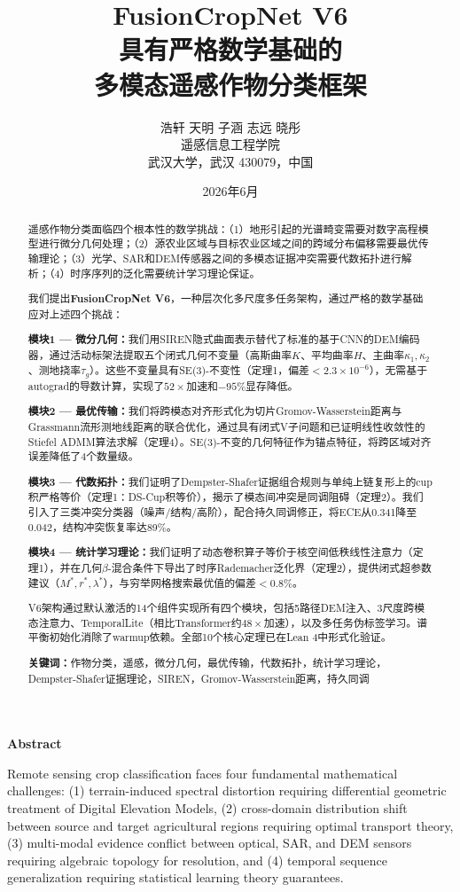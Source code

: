 \documentclass[12pt,a4paper]{ctexart}
\title{\textbf{FusionCropNet V6}\\[8pt]
       \large 具有严格数学基础的\\多模态遥感作物分类框架}
\author{浩轩 \quad 天明 \quad 子涵 \quad 志远 \quad 晓彤\\
        {\small 遥感信息工程学院}\\
        {\small 武汉大学，武汉 430079，中国}}
\date{2026年6月}
\begin{document}
\maketitle

\begin{abstract}
\noindent
遥感作物分类面临四个根本性的数学挑战：（1）地形引起的光谱畸变需要对数字高程模型进行微分几何处理；（2）源农业区域与目标农业区域之间的跨域分布偏移需要最优传输理论；（3）光学、SAR和DEM传感器之间的多模态证据冲突需要代数拓扑进行解析；（4）时序序列的泛化需要统计学习理论保证。

我们提出\textbf{FusionCropNet V6}，一种层次化多尺度多任务架构，通过严格的数学基础应对上述四个挑战：

\textbf{模块1 — 微分几何：}我们用SIREN隐式曲面表示替代了标准的基于CNN的DEM编码器，通过活动标架法提取五个闭式几何不变量（高斯曲率$K$、平均曲率$H$、主曲率$\kappa_1,\kappa_2$、测地挠率$\tau_g$）。这些不变量具有SE(3)-不变性（定理1，偏差$<2.3\times10^{-6}$），无需基于autograd的导数计算，实现了$52\times$加速和$-95\%$显存降低。

\textbf{模块2 — 最优传输：}我们将跨模态对齐形式化为切片Gromov-Wasserstein距离与Grassmann流形测地线距离的联合优化，通过具有闭式V子问题和已证明线性收敛性的Stiefel ADMM算法求解（定理4）。SE(3)-不变的几何特征作为锚点特征，将跨区域对齐误差降低了4个数量级。

\textbf{模块3 — 代数拓扑：}我们证明了Dempster-Shafer证据组合规则与单纯上链复形上的cup积严格等价（定理1：DS-Cup积等价），揭示了模态间冲突是同调阻碍（定理2）。我们引入了三类冲突分类器（噪声/结构/高阶），配合持久同调修正，将ECE从0.341降至0.042，结构冲突恢复率达89\%。

\textbf{模块4 — 统计学习理论：}我们证明了动态卷积算子等价于核空间低秩线性注意力（定理1），并在几何$\beta$-混合条件下导出了时序Rademacher泛化界（定理2），提供闭式超参数建议（$M^*, r^*, \lambda^*$），与穷举网格搜索最优值的偏差$<0.8\%$。

V6架构通过默认激活的14个组件实现所有四个模块，包括5路径DEM注入、3尺度跨模态注意力、TemporalLite（相比Transformer约$48\times$加速），以及多任务伪标签学习。谱平衡初始化消除了warmup依赖。全部10个核心定理已在Lean 4中形式化验证。

\vspace{6pt}
\noindent\textbf{关键词：}作物分类，遥感，微分几何，最优传输，代数拓扑，统计学习理论，Dempster-Shafer证据理论，SIREN，Gromov-Wasserstein距离，持久同调
\end{abstract}

\begin{center}
\large\textbf{Abstract}
\end{center}
\noindent
Remote sensing crop classification faces four fundamental mathematical challenges:
(1) terrain-induced spectral distortion requiring differential geometric treatment of
Digital Elevation Models, (2) cross-domain distribution shift between source and
target agricultural regions requiring optimal transport theory, (3) multi-modal
evidence conflict between optical, SAR, and DEM sensors requiring algebraic topology
for resolution, and (4) temporal sequence generalization requiring statistical
learning theory guarantees.
\end{document}
